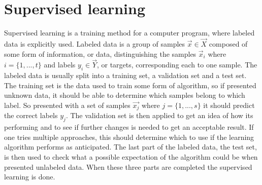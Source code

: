 \section{Supervised learning}
Supervised learning is a training method for a computer program, where labeled data is explicitly used. Labeled data is a group of samples $\vec{x} \in \vec{X} $ composed of some form of information, or data, distinguishing the samples $\vec{x}_i $ where $i = \{1,...,t\} $ and labels $y_i \in \vec{Y}$, or targets, corresponding each to one sample. The labeled data is usually split into a training set, a validation set and a test set. The training set is the data used to train some form of algorithm, so if presented unknown data, it should be able to determine which samples belong to which label. So presented with a set of samples $\vec{x_j}$ where $j = \{1,...,s\}$ it should predict the correct labels $y_j$. The validation set is then applied to get an idea of how its performing and to see if further changes is needed to get an acceptable result. If one tries multiple approaches, this should determine which to use if the learning algorithm performs as anticipated. The last part of the labeled data, the test set, is then used to check what a possible expectation of the algorithm could be when presented unlabeled data. When these three parts are completed the supervised learning is done. 
